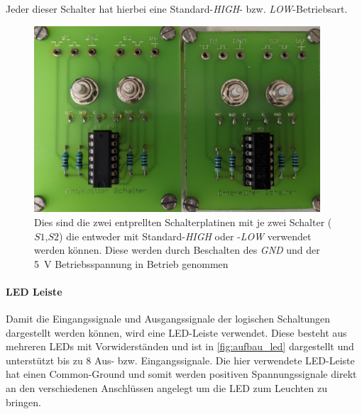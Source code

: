 \documentclass[12pt,english,ngerman]{scrartcl}
\begin{document}
Jeder dieser Schalter hat hierbei eine Standard-\textit{HIGH}- bzw.
\textit{LOW}-Betriebsart.

\begin{figure}[H]
  \centering
    \includegraphics[width=0.95\textwidth]{./figures/messungen/schalter.jpg}
  \caption{Dies sind die zwei entprellten Schalterplatinen mit je zwei Schalter
    ($S1$,$S2$) die entweder mit Standard-\textit{HIGH} oder -\textit{LOW} verwendet
    werden können. Diese werden durch Beschalten des \textit{GND} und der \SI{5}{\volt}
    Betriebsspannung in Betrieb genommen}
  \label{fig:aufbau_schalter}
\end{figure}


\paragraph{LED Leiste}
Damit die Eingangssignale und Ausgangssignale der logischen Schaltungen
dargestellt werden können, wird eine LED-Leiste verwendet. Diese besteht aus
mehreren LEDs mit Vorwiderständen und ist in \autoref{fig:aufbau_led} dargestellt und
unterstützt bis zu 8 Aus- bzw. Eingangssignale. Die hier verwendete LED-Leiste
hat einen Common-Ground und somit werden positiven Spannungssignale direkt an den
verschiedenen Anschlüssen angelegt um die LED zum Leuchten zu bringen.
\end{document}
